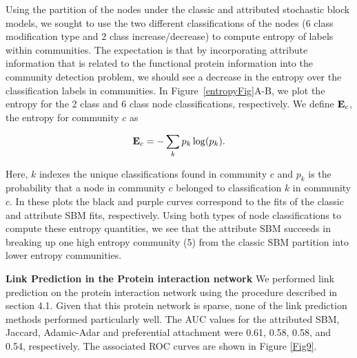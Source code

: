 Using the partition of the nodes under the classic and attributed stochastic block models, we sought to use the two different classifications of the nodes (6 class modification type and 2 class increase/decrease) to compute entropy of labels within communities. The expectation is that by incorporating attribute information that is related to the functional protein information into the community detection problem, we should see a decrease in the entropy over the classification labels in communities. In Figure~\ref{entropyFig}A-B, we plot the entropy for the 2 class and 6 class node classifications, respectively. We define ${\bf E}_{c}$, the entropy for community $c$ as

\begin{equation}
{\bf E}_{c}=-\sum_{k} p_{k}\log(p_{k}).
\end{equation}

Here, $k$ indexes the unique classifications found in community $c$ and $p_{k}$ is the probability that a node in community $c$ belonged to classification $k$ in community $c$. In these plots the black and purple curves correspond to the fits of the classic and attribute SBM fits, respectively. Using both types of node classifications to compute these entropy quantities, we see that the attribute SBM succeeds in breaking up one high entropy community (5) from the classic SBM partition into lower entropy communities. 

{\bf Link Prediction in the Protein interaction network}
We performed link prediction on the protein interaction network using the procedure described in section 4.1. Given that this protein network is sparse, none of the link prediction methods performed particularly well. The AUC values for the attributed SBM, Jaccard, Adamic-Adar and preferential attachment were 0.61, 0.58, 0.58, and 0.54, respectively. The associated ROC curves are shown in Figure \ref{Fig9}.  

